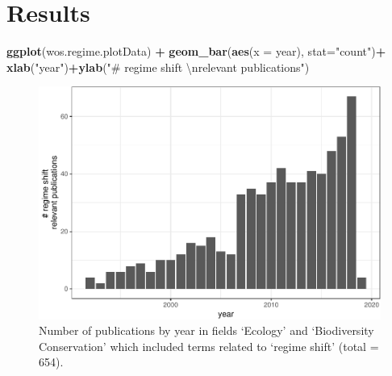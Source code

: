 \documentclass[12pt,twoside,openany]{reedthesis}
\newenvironment{Shaded}{\begin{snugshade}}{\end{snugshade}}
\newcommand{\KeywordTok}[1]{\textcolor[rgb]{0.13,0.29,0.53}{\textbf{#1}}}
\newcommand{\DataTypeTok}[1]{\textcolor[rgb]{0.13,0.29,0.53}{#1}}
\newcommand{\CharTok}[1]{\textcolor[rgb]{0.31,0.60,0.02}{#1}}
\newcommand{\StringTok}[1]{\textcolor[rgb]{0.31,0.60,0.02}{#1}}
\newcommand{\OperatorTok}[1]{\textcolor[rgb]{0.81,0.36,0.00}{\textbf{#1}}}
\newcommand{\NormalTok}[1]{#1}
\begin{document}
\section{Results}\label{results}
\begin{Shaded}
\begin{Highlighting}[]
\KeywordTok{ggplot}\NormalTok{(wos.regime.plotData) }\OperatorTok{+}
\StringTok{  }\KeywordTok{geom_bar}\NormalTok{(}\KeywordTok{aes}\NormalTok{(}\DataTypeTok{x =}\NormalTok{ year), }\DataTypeTok{stat=}\StringTok{"count"}\NormalTok{)}\OperatorTok{+}
\StringTok{  }\KeywordTok{xlab}\NormalTok{(}\StringTok{"year"}\NormalTok{)}\OperatorTok{+}\KeywordTok{ylab}\NormalTok{(}\StringTok{"# regime shift }\CharTok{\textbackslash{}n}\StringTok{relevant publications"}\NormalTok{)}
\end{Highlighting}
\end{Shaded}
\begin{figure}
\centering
\includegraphics{_myDissertation_files/figure-latex/wosRegimePubsByYear-1.pdf}
\caption{\label{fig:wosRegimePubsByYear}Number of publications by year in
fields `Ecology' and `Biodiversity Conservation' which included terms
related to `regime shift' (total = 654).}
\end{figure}
\end{document}
